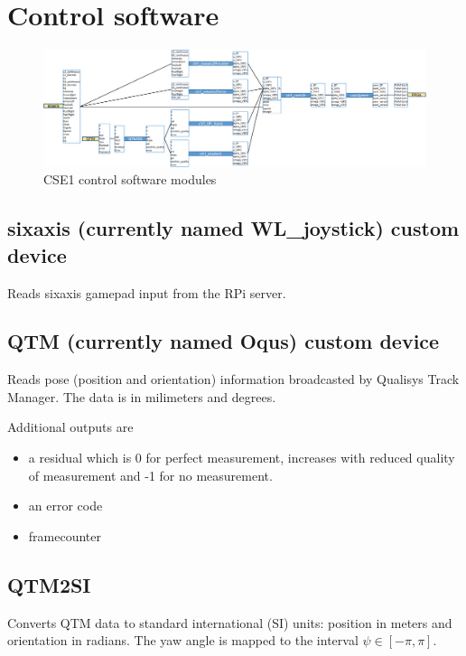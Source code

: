 \documentclass[a4paper,twoside,english]{report}
\begin{document}
\section{\label{subsec: CSE1 Control software}Control software}

\begin{figure}[!h]
\centering \includegraphics[width=1\textwidth]{fig/CSE1_software_modules}
\caption{CSE1 control software modules}

\label{fig: CSE1 control software} 
\end{figure}


\subsection{sixaxis (currently named WL\_joystick) custom device}

Reads sixaxis gamepad input from the RPi server.

\subsection{QTM (currently named Oqus) custom device}

Reads pose (position and orientation) information broadcasted by Qualisys
Track Manager. The data is in milimeters and degrees.

Additional outputs are
\begin{itemize}
\item a residual which is 0 for perfect measurement, increases with reduced
quality of measurement and -1 for no measurement.
\item an error code
\item framecounter
\end{itemize}

\subsection{QTM2SI}

Converts QTM data to standard international (SI) units: position in
meters and orientation in radians. The yaw angle is mapped to the
interval $\psi\in\left[-\pi,\pi\right]$.
\end{document}
